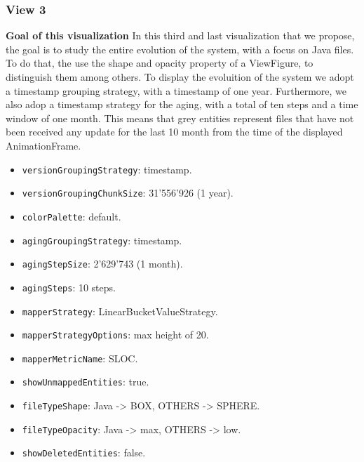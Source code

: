 \subsubsection{View 3}
\textbf{Goal of this visualization}
In this third and last visualization that we propose, the goal is to study the entire evolution of the system, with a focus on Java files. 
To do that, the use the shape and opacity property of a ViewFigure, to distinguish them among others. 
To display the evoluition of the system we adopt a timestamp grouping strategy, with a timestamp of one year. 
Furthermore, we also adop a timestamp strategy for the aging, with a total of ten steps and a time window of one month. This means that grey entities represent files that have not been received any update for the last 10 month from the time of the displayed AnimationFrame. 
\begin{itemize}
    \item \texttt{versionGroupingStrategy}: timestamp.
    \item \texttt{versionGroupingChunkSize}: 31'556'926 (1 year). 
    \item \texttt{colorPalette}: default.
    \item \texttt{agingGroupingStrategy}: timestamp.
    \item \texttt{agingStepSize}: 2'629'743 (1 month).
    \item \texttt{agingSteps}: 10 steps. 
    \item \texttt{mapperStrategy}: LinearBucketValueStrategy.
    \item \texttt{mapperStrategyOptions}: max height of 20.
    \item \texttt{mapperMetricName}: SLOC. 
    \item \texttt{showUnmappedEntities}: true.
    \item \texttt{fileTypeShape}: Java -> BOX, OTHERS -> SPHERE. 
    \item \texttt{fileTypeOpacity}: Java -> max, OTHERS -> low. 
    \item \texttt{showDeletedEntities}: false.
\end{itemize}

